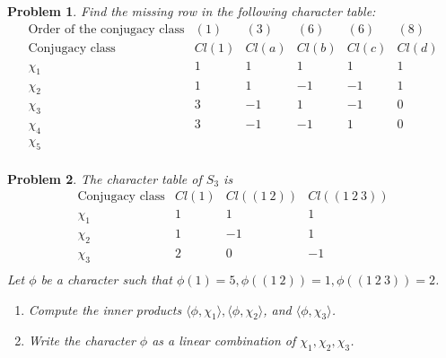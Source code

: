 \documentclass[10pt]{article}
\newcommand{\sk}{\vskip 10mm}
\theoremstyle{plain}
\newtheorem{problem}{Problem}
\theoremstyle{remark}
\begin{document}
\sk

\begin{problem}
  Find the missing row in the following character table:
  \[
    \begin{array}{c|ccccc}
      \text{Order of the conjugacy class} & (1) & (3) & (6) & (6) & (8)\\
      \text{Conjugacy class} & Cl(1) & Cl(a) & Cl(b) & Cl(c) & Cl(d)\\
      \hline
      \chi_1 & 1 & 1 & 1 & 1 & 1\\
      \chi_2 & 1 & 1 & -1 & -1 & 1\\
      \chi_3 & 3 & -1 & 1 & -1 & 0\\
      \chi_4 & 3 & -1 & -1 & 1 & 0\\
      \chi_5 &&&&&\\
    \end{array}
  \]
\end{problem}

\sk

\begin{problem}
  The character table of $S_3$ is
  \[
    \begin{array}{c|ccc}
      \text{Conjugacy class} & Cl(1) & Cl((1\ 2)) & Cl((1\ 2\ 3))\\
      \hline
      \chi_1 & 1 & 1 & 1\\
      \chi_2 & 1 & -1 & 1\\
      \chi_3 & 2 & 0 & -1\\
    \end{array}
  \]
  Let $\phi$ be a character such that
  $\phi(1)=5,\phi((1\ 2))=1,\phi((1\ 2\ 3))=2$.
  \begin{enumerate}
  \item[(a)] Compute the inner products
    $\langle \phi,\chi_1\rangle,\langle \phi,\chi_2\rangle$,
    and $\langle \phi,\chi_3\rangle$.
  \item[(b)] Write the character $\phi$ as a linear combination of
    $\chi_1,\chi_2,\chi_3$.
  \end{enumerate}
\end{problem}
\end{document}
